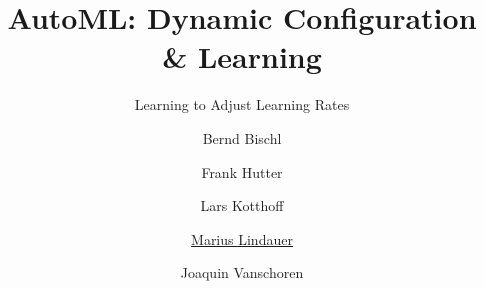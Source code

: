 



\title[AutoML: Learned LRs]{AutoML: Dynamic Configuration \& Learning}
\subtitle{Learning to Adjust Learning Rates}
\author[Marius Lindauer]{Bernd Bischl \and Frank Hutter \and Lars Kotthoff\newline \and \underline{Marius Lindauer} \and Joaquin Vanschoren}
\institute{}
\date{}





	
	\maketitle
	
